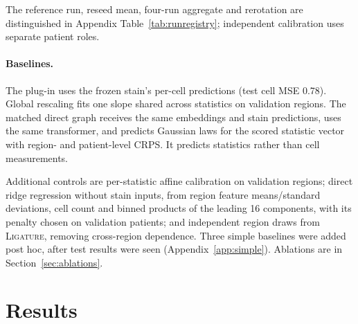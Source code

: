 \documentclass[10pt,letterpaper]{article}
\theoremstyle{definition}
\theoremstyle{remark}
\newcommand{\method}{\textnormal{\textsc{Ligature}}}
\begin{document}
The reference run, reseed mean, four-run aggregate and rerotation are distinguished in Appendix Table~\ref{tab:runregistry}; independent calibration uses separate patient roles.

\paragraph{Baselines.} The plug-in uses the frozen stain's per-cell predictions (test cell MSE 0.78). Global rescaling fits one slope shared across statistics on validation regions. The matched direct graph receives the same embeddings and stain predictions, uses the same transformer, and predicts Gaussian laws for the scored statistic vector with region- and patient-level CRPS. It predicts statistics rather than cell measurements.

Additional controls are per-statistic affine calibration on validation regions; direct ridge regression without stain inputs, from region feature means/standard deviations, cell count and binned products of the leading 16 components, with its penalty chosen on validation patients; and independent region draws from \method{}, removing cross-region dependence. Three simple baselines were added post hoc, after test results were seen (Appendix~\ref{app:simple}). Ablations are in Section~\ref{sec:ablations}.
\section{Results}
\label{sec:results}
\end{document}
